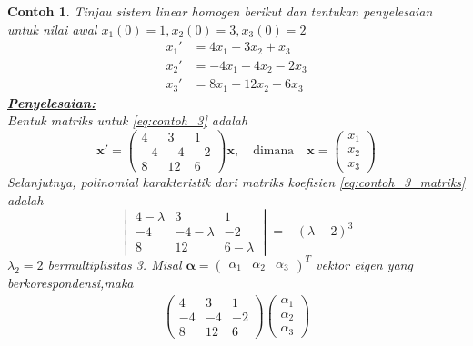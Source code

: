 \documentclass[a4paper]{article}
\theoremstyle{definisi}
\newtheorem{contoh}{Contoh}[section]
\newcommand{\bfalpha}{\boldsymbol{\alpha}}
\newcommand{\penyelesaian}{\textbf{\underline{Penyelesaian:}}\\}
\numberwithin{equation}{section}
\begin{document}
  \begin{contoh}
    Tinjau sistem linear homogen berikut dan tentukan penyelesaian untuk nilai awal $x_1(0)=1,x_2(0)=3,x_3(0)=2$
    \begin{equation}\label{eq:contoh_3}
      \begin{split}
        x_1'&=4x_1+3x_2+x_3\\
        x_2'&=-4x_1-4x_2-2x_3\\
        x_3'&=8x_1+12x_2+6x_3
      \end{split}
    \end{equation}
    \penyelesaian
    Bentuk matriks untuk \eqref{eq:contoh_3} adalah
    \begin{equation}\label{eq:contoh_3_matriks}
      \mathbf{x'}=\begin{pmatrix}
        4&3&1\\
        -4&-4&-2\\
        8&12&6
      \end{pmatrix}\mathbf{x},\quad\text{dimana}\quad \mathbf{x}=\begin{pmatrix}
        x_1\\x_2\\x_3
      \end{pmatrix}
    \end{equation}
    Selanjutnya, polinomial karakteristik dari matriks koefisien \eqref{eq:contoh_3_matriks} adalah
    \begin{equation*}
      \begin{vmatrix}
        4-\lambda&3&1\\
        -4&-4-\lambda&-2\\
        8&12&6-\lambda
      \end{vmatrix}=-(\lambda-2)^3
    \end{equation*}
    $\lambda_2=2$ bermultiplisitas 3. Misal $\bfalpha=\begin{pmatrix}
      \alpha_1&\alpha_2&\alpha_3
    \end{pmatrix}^T$ vektor eigen yang berkorespondensi,maka
    \begin{align*}
      \begin{pmatrix}
        4&3&1\\
        -4&-4&-2\\
        8&12&6
      \end{pmatrix}\begin{pmatrix}
        \alpha_1\\\alpha_2\\\alpha_3
      \end{pmatrix}

\end{align*}
\end{contoh}
\end{document}
